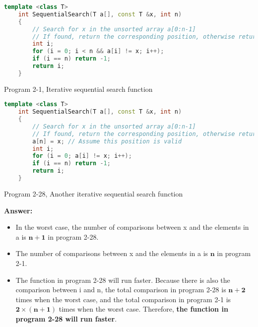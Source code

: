 \documentclass{article}
\begin{document}
\begin{lstlisting}[language=C++]
    template <class T>
    int SequentialSearch(T a[], const T &x, int n)
    {
        // Search for x in the unsorted array a[0:n-1]
        // If found, return the corresponding position, otherwise return -1
        int i;
        for (i = 0; i < n && a[i] != x; i++);
        if (i == n) return -1;
        return i;
    }
\end{lstlisting}
\begin{center}
    Program 2-1, Iterative sequential search function
\end{center}

\begin{lstlisting}[language=C++]
    template <class T>
    int SequentialSearch(T a[], const T &x, int n)
    {
        // Search for x in the unsorted array a[0:n-1]
        // If found, return the corresponding position, otherwise return -1
        a[n] = x; // Assume this position is valid
        int i;
        for (i = 0; a[i] != x; i++);
        if (i == n) return -1;
        return i;
    }
\end{lstlisting}
\begin{center}
    Program 2-28, Another iterative sequential search function
\end{center}

\textbf{Answer:}
\begin{itemize}
    \item In the worst case, the number of comparisons between x and the elements in a is $\mathbf{n+1}$ in program 2-28.
    \item The number of comparisons between x and the elements in a is $\mathbf{n}$ in program 2-1.
    \item The function in program 2-28 will run faster. Because there is also the comparison between i and n, the total comparison in program 2-28 is $\mathbf{n+2}$ times when the worst case, and the total comparison in program 2-1 is $\mathbf{2\times (n+1)}$ times when the worst case. Therefore, \textbf{the function in program 2-28 will run faster}.
\end{itemize}
\end{document}
